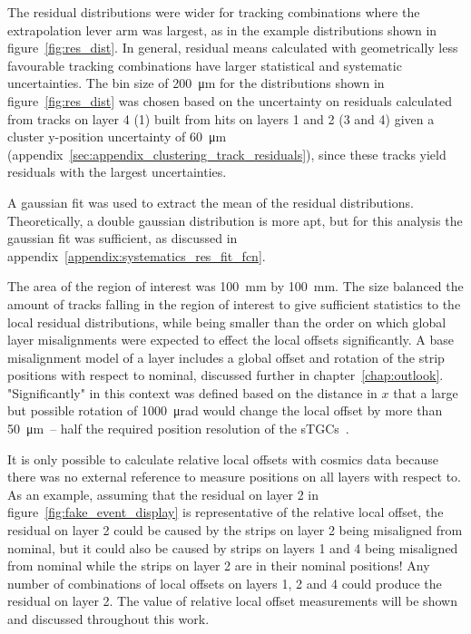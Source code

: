 The residual distributions were wider for tracking combinations where the extrapolation lever arm was largest, as in the example distributions shown in figure~\ref{fig:res_dist}. In general, residual means calculated with geometrically less favourable tracking combinations have larger statistical and systematic uncertainties. The bin size of \SI{200}{\micro\meter} for the distributions shown in figure~\ref{fig:res_dist} was chosen based on the uncertainty on residuals calculated from tracks on layer 4 (1) built from hits on layers 1 and 2 (3 and 4) given a cluster y-position uncertainty of \SI{60}{\micro\meter} (appendix~\ref{sec:appendix_clustering_track_residuals}), since these tracks yield residuals with the largest uncertainties.

A gaussian fit was used to extract the mean of the residual distributions. Theoretically, a double gaussian distribution is more apt, but for this analysis the gaussian fit was sufficient, as discussed in appendix~\ref{appendix:systematics_res_fit_fcn}.

The area of the region of interest was \SI{100}{\milli\meter} by \SI{100}{\milli\meter}. The size balanced the amount of tracks falling in the region of interest to give sufficient statistics to the local residual distributions, while being smaller than the order on which global layer misalignments were expected to effect the local offsets significantly. A base  misalignment model of a layer includes a global offset and rotation of the strip positions with respect to nominal, discussed further in chapter~\ref{chap:outlook}. "Significantly" in this context was defined based on the distance in $x$ that a large but possible rotation of \SI{1000}{\micro\radian} would change the local offset by more than \SI{50}{\micro\meter}~-- half the required position resolution of the sTGCs~\cite{nsw_tdr}.

It is only possible to calculate relative local offsets with cosmics data because there was no external reference to measure positions on all layers with respect to. As an example, assuming that the residual on layer 2 in figure~\ref{fig:fake_event_display} is representative of the relative local offset, the residual on layer 2 could be caused by the strips on layer 2 being misaligned from nominal, but it could also be caused by strips on layers 1 and 4 being misaligned from nominal while the strips on layer 2 are in their nominal positions! Any number of combinations of local offsets on layers 1, 2 and 4 could produce the residual on layer 2. The value of relative local offset measurements will be shown and discussed throughout this work.

